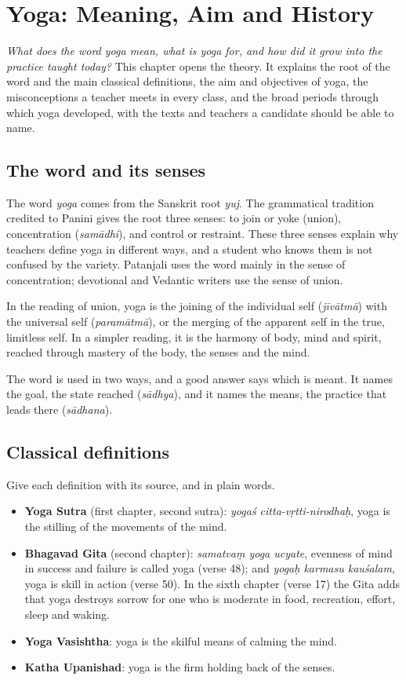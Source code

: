 \chapter{Yoga: Meaning, Aim and History}
\label{ch:meaning-history}

\emph{What does the word yoga mean, what is yoga for, and how did it grow into the practice taught today?}
This chapter opens the theory. It explains the root of the word and the main classical definitions, the aim and objectives of yoga, the misconceptions a teacher meets in every class, and the broad periods through which yoga developed, with the texts and teachers a candidate should be able to name.

\section{The word and its senses}

The word \emph{yoga} comes from the Sanskrit root \emph{yuj}. The grammatical tradition credited to Panini gives the root three senses: to join or yoke (union), concentration (\emph{samādhi}), and control or restraint. These three senses explain why teachers define yoga in different ways, and a student who knows them is not confused by the variety. Patanjali uses the word mainly in the sense of concentration; devotional and Vedantic writers use the sense of union.

In the reading of union, yoga is the joining of the individual self (\emph{jīvātmā}) with the universal self (\emph{paramātmā}), or the merging of the apparent self in the true, limitless self. In a simpler reading, it is the harmony of body, mind and spirit, reached through mastery of the body, the senses and the mind.

The word is used in two ways, and a good answer says which is meant. It names the goal, the state reached (\emph{sādhya}), and it names the means, the practice that leads there (\emph{sādhana}).

\section{Classical definitions}

Give each definition with its source, and in plain words.
\begin{itemize}
\item \textbf{Yoga Sutra} (first chapter, second sutra): \emph{yogaś citta-vṛtti-nirodhaḥ}, yoga is the stilling of the movements of the mind.
\item \textbf{Bhagavad Gita} (second chapter): \emph{samatvaṃ yoga ucyate}, evenness of mind in success and failure is called yoga (verse 48); and \emph{yogaḥ karmasu kauśalam}, yoga is skill in action (verse 50). In the sixth chapter (verse 17) the Gita adds that yoga destroys sorrow for one who is moderate in food, recreation, effort, sleep and waking.
\item \textbf{Yoga Vasishtha}: yoga is the skilful means of calming the mind.
\item \textbf{Katha Upanishad}: yoga is the firm holding back of the senses.
\end{itemize}


